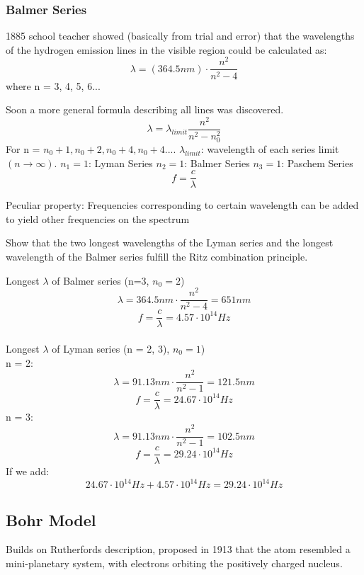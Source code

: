 \documentclass[class=article,crop=false]{standalone}
\begin{document}
\subsubsection{Balmer Series}
1885 school teacher showed (basically from trial and error) that the wavelengths of the hydrogen emission lines in the visible region could be calculated as:\\
$$ \lambda = (364.5 nm)\cdot \frac{n^2}{n^2-4} $$
where n = 3, 4, 5, 6...\\

\begin{result}
	Soon a more general formula describing all lines was discovered.
	$$ \lambda = \lambda_{limit} \frac{n^2}{n^2 - n_0^2} $$
	For n = $n_0 + 1, n_0 + 2, n_0 + 4, n_0 + 4 ....$
	$\lambda_{limit}$: wavelength of each series limit $(n \rightarrow \infty)$.
	$n_1 = 1$: Lyman Series
	$n_2 = 1$: Balmer Series
	$n_3 = 1$: Paschem Series
	$$ f = \frac{c}{\lambda} $$
\end{result}

\begin{result}
	Peculiar property: Frequencies corresponding to certain wavelength can be added to yield other frequencies on the spectrum
\end{result}
\newpage
\begin{question}
	Show that the two longest wavelengths of the Lyman series and the longest wavelength of the Balmer series fulfill the Ritz combination principle.
	\begin{answer}[Answer]
		Longest $\lambda$ of Balmer series (n=3, $n_0 = 2$)
		$$\lambda = 364.5 nm \cdot \frac{n^2}{n^2-4} = 651 nm $$
		$$ f = \frac{c}{\lambda} = 4.57 \cdot 10^{14} Hz $$
\\
	Longest $\lambda$ of Lyman series (n = 2, 3), $n_0 = 1$)\\
	n = 2:\\
		$$\lambda = 91.13 nm \cdot \frac{n^2}{n^2-1} = 121.5 nm $$
		$$ f = \frac{c}{\lambda} = 24.67 \cdot 10^{14} Hz $$
	n = 3:\\
		$$\lambda = 91.13 nm \cdot \frac{n^2}{n^2-1} = 102.5 nm $$
		$$ f = \frac{c}{\lambda} = 29.24 \cdot 10^{14} Hz $$
	If we add: \\
	$$ 24.67 \cdot 10^{14} Hz + 4.57 \cdot 10^{14} Hz = 29.24 \cdot 10^{14} Hz $$
	\end{answer}
\end{question}


\subsection{Bohr Model}
Builds on Rutherfords description, proposed in 1913 that the atom resembled a mini-planetary system, with electrons orbiting the positively charged nucleus.\\
\end{document}
